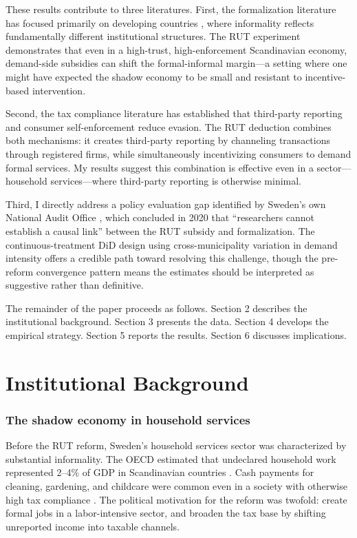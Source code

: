 \documentclass[12pt]{article}
\begin{document}
These results contribute to three literatures. First, the formalization literature has focused primarily on developing countries \citep{ulyssea2018firms, laporta2014informality, meghir2015wages}, where informality reflects fundamentally different institutional structures. The RUT experiment demonstrates that even in a high-trust, high-enforcement Scandinavian economy, demand-side subsidies can shift the formal-informal margin---a setting where one might have expected the shadow economy to be small and resistant to incentive-based intervention.

Second, the tax compliance literature has established that third-party reporting \citep{kleven2011unwilling} and consumer self-enforcement \citep{naritomi2019consumers, pomeranz2015no} reduce evasion. The RUT deduction combines both mechanisms: it creates third-party reporting by channeling transactions through registered firms, while simultaneously incentivizing consumers to demand formal services. My results suggest this combination is effective even in a sector---household services---where third-party reporting is otherwise minimal.

Third, I directly address a policy evaluation gap identified by Sweden's own National Audit Office \citep{riksrevisionen2020}, which concluded in 2020 that ``researchers cannot establish a causal link'' between the RUT subsidy and formalization. The continuous-treatment DiD design using cross-municipality variation in demand intensity offers a credible path toward resolving this challenge, though the pre-reform convergence pattern means the estimates should be interpreted as suggestive rather than definitive.

The remainder of the paper proceeds as follows. Section 2 describes the institutional background. Section 3 presents the data. Section 4 develops the empirical strategy. Section 5 reports the results. Section 6 discusses implications.


\section{Institutional Background}

\subsubsection*{The shadow economy in household services} Before the RUT reform, Sweden's household services sector was characterized by substantial informality. The OECD estimated that undeclared household work represented 2--4\% of GDP in Scandinavian countries \citep{du2005household}. Cash payments for cleaning, gardening, and childcare were common even in a society with otherwise high tax compliance \citep{halla2012tax}. The political motivation for the reform was twofold: create formal jobs in a labor-intensive sector, and broaden the tax base by shifting unreported income into taxable channels.
\end{document}
